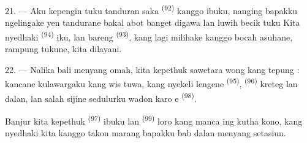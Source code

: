 21. --- Aku kepengin tuku tanduran saka 
\textsuperscript{(92)} kanggo ibuku, nanging bapakku ngelingake yen
tandurane bakal abot banget digawa lan luwih becik tuku 
Kita nyedhaki  \textsuperscript{(94)} iku, lan bareng
 \textsuperscript{(93)}, kang lagi milihake kanggo bocah
asuhane, rampung tukune, kita dilayani.

22. --- Nalika bali menyang omah, kita kepethuk sawetara wong kang
tepung : kancane kulawargaku kang wis tuwa, kang nyekeli lengene
 \textsuperscript{(95)}, 
\textsuperscript{(96)} kreteg lan dalan, lan salah sijine sedulurku wadon
karo e \textsuperscript{(98)}.

Banjur kita kepethuk  \textsuperscript{(97)}
ibuku lan  \textsuperscript{(99)} loro kang manca ing
kutha kono, kang nyedhaki kita kanggo takon marang bapakku bab dalan
menyang setasiun.

\VUsaut{6.0mm}
\VUfilet{22mm}
